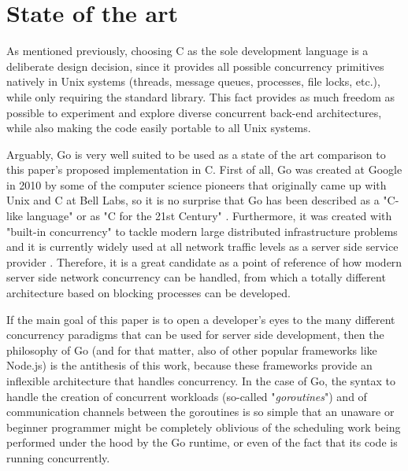 \section{State of the art}
As mentioned previously, choosing C as the sole development language is a deliberate design decision, since it provides all possible concurrency primitives natively in Unix systems (threads, message queues, processes, file locks, etc.), while only requiring the standard library. This fact provides as much freedom as possible to experiment and explore diverse concurrent back-end architectures, while also making the code easily portable to all Unix systems.

Arguably, Go is very well suited to be used as a state of the art comparison to this paper's proposed implementation in C. First of all, Go was created at Google in 2010 by some of the computer science pioneers that originally came up with Unix and C at Bell Labs, so it is no surprise that Go has been described as a "C-like language" or as "C for the 21st Century" \cite{GoPL2015}. Furthermore, it was created with "built-in concurrency" to tackle modern large distributed infrastructure problems and it is currently widely used at all network traffic levels as a server side service provider \cite{Pike2012}. Therefore, it is a great candidate as a point of reference of how modern server side network concurrency can be handled, from which a totally different architecture based on blocking processes can be developed. 

If the main goal of this paper is to open a developer's eyes to the many different concurrency paradigms that can be used for server side development, then the philosophy of Go (and for that matter, also of other popular frameworks like Node.js) is the antithesis of this work, because these frameworks provide an inflexible architecture that handles concurrency. In the case of Go, the syntax to handle the creation of concurrent workloads (so-called "\textit{goroutines}") and of communication channels between the goroutines is so simple that an unaware or beginner programmer might be completely oblivious of the scheduling work being performed under the hood by the Go runtime, or even of the fact that its code is running concurrently. 

